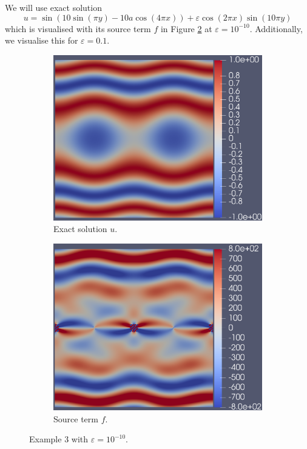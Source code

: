 \documentclass[12pt]{ociamthesis}
\begin{document}
We will use exact solution
\begin{equation}
u = \sin(10\sin(\pi y)-10a\cos(4 \pi x)) + \varepsilon \cos(2 \pi x)\sin(10 \pi y)
\end{equation}
which is visualised with its source term $f$ in Figure \ref{E3_uf} at $\varepsilon = 10^{-10}$. Additionally, we visualise this for $\varepsilon = 0.1$.
\begin{figure}[H]
 \begin{subfigure}{0.5\textwidth} \label{E3_u}
     \includegraphics[width=\textwidth]{Pics/uf/U_E3_eps_10.png}
     \caption{Exact solution $u$.}
 \end{subfigure}
   \begin{subfigure}{0.5\textwidth}
     \includegraphics[width=\textwidth]{Pics/uf/F_E3_eps_10.png}
     \caption{Source term $f$.}
 \end{subfigure}
 \caption{Example $3$ with $\varepsilon = 10^{-10}$.} \label{E3_uf}
\end{figure}
\end{document}

